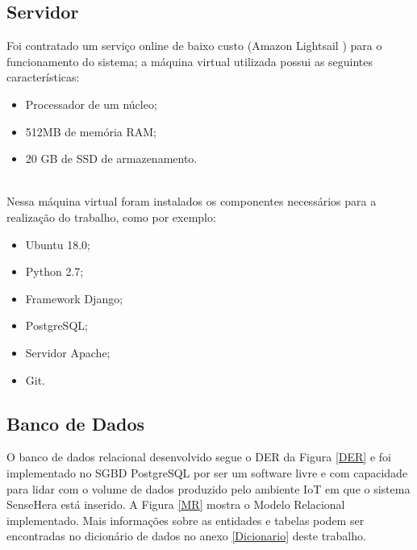 \subsection{Servidor}
\nul \quad Foi contratado um serviço online de baixo custo (Amazon Lightsail \cite{lightsail}) para o funcionamento do sistema; a máquina virtual utilizada possui as seguintes características:
\begin{itemize}
  \item Processador de um núcleo;
  \item 512MB de memória RAM;
  \item 20 GB de SSD de armazenamento.
\end{itemize}
\\\null \quad Nessa máquina virtual foram instalados os componentes necessários para a realização do trabalho, como por exemplo:
\begin{itemize}
  \item Ubuntu 18.0;
  \item Python 2.7;
  \item Framework Django;
  \item PostgreSQL;
  \item Servidor Apache;
  \item Git.
\end{itemize}

\subsection{Banco de Dados}
\null \quad O banco de dados relacional desenvolvido segue o \acrfull{DER} da Figura \ref{DER} e foi implementado no \acrfull{SGBD} PostgreSQL por ser um software livre e com capacidade para lidar com o volume de dados produzido pelo ambiente \acrshort{IoT} em que o sistema SenseHera está inserido. A Figura \ref{MR} mostra o Modelo Relacional implementado. Mais informações sobre as entidades e tabelas podem ser encontradas no dicionário de dados no anexo \ref{Dicionario} deste trabalho.

\newpage
{}

